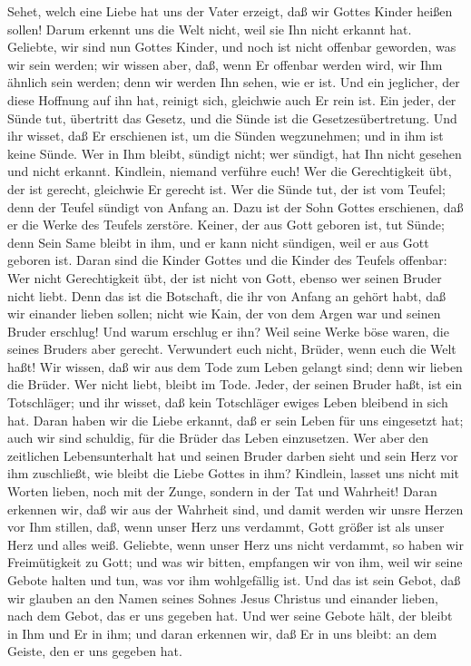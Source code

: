  Sehet, welch eine Liebe hat uns der Vater erzeigt, daß
wir Gottes Kinder heißen sollen! Darum erkennt uns die Welt nicht, weil
sie Ihn nicht erkannt hat.  Geliebte, wir sind nun Gottes
Kinder, und noch ist nicht offenbar geworden, was wir sein werden; wir
wissen aber, daß, wenn Er offenbar werden wird, wir Ihm ähnlich sein
werden; denn wir werden Ihn sehen, wie er ist.  Und ein
jeglicher, der diese Hoffnung auf ihn hat, reinigt sich, gleichwie auch
Er rein ist.  Ein jeder, der Sünde tut, übertritt das
Gesetz, und die Sünde ist die Gesetzesübertretung.  Und
ihr wisset, daß Er erschienen ist, um die Sünden wegzunehmen; und in ihm
ist keine Sünde.  Wer in Ihm bleibt, sündigt nicht; wer
sündigt, hat Ihn nicht gesehen und nicht erkannt. 
Kindlein, niemand verführe euch! Wer die Gerechtigkeit übt, der ist
gerecht, gleichwie Er gerecht ist. Wer die Sünde tut, der ist vom
Teufel; denn der Teufel sündigt von Anfang an.  Dazu ist
der Sohn Gottes erschienen, daß er die Werke des Teufels zerstöre.
 Keiner, der aus Gott geboren ist, tut Sünde; denn Sein
Same bleibt in ihm, und er kann nicht sündigen, weil er aus Gott geboren
ist.  Daran sind die Kinder Gottes und die Kinder des
Teufels offenbar: Wer nicht Gerechtigkeit übt, der ist nicht von Gott,
ebenso wer seinen Bruder nicht liebt.  Denn das ist die
Botschaft, die ihr von Anfang an gehört habt, daß wir einander lieben
sollen;  nicht wie Kain, der von dem Argen war und seinen
Bruder erschlug! Und warum erschlug er ihn? Weil seine Werke böse waren,
die seines Bruders aber gerecht.  Verwundert euch nicht,
Brüder, wenn euch die Welt haßt!  Wir wissen, daß wir aus
dem Tode zum Leben gelangt sind; denn wir lieben die Brüder. Wer nicht
liebt, bleibt im Tode.  Jeder, der seinen Bruder haßt,
ist ein Totschläger; und ihr wisset, daß kein Totschläger ewiges Leben
bleibend in sich hat.  Daran haben wir die Liebe erkannt,
daß er sein Leben für uns eingesetzt hat; auch wir sind schuldig, für
die Brüder das Leben einzusetzen.  Wer aber den
zeitlichen Lebensunterhalt hat und seinen Bruder darben sieht und sein
Herz vor ihm zuschließt, wie bleibt die Liebe Gottes in ihm?
 Kindlein, lasset uns nicht mit Worten lieben, noch mit
der Zunge, sondern in der Tat und Wahrheit!  Daran
erkennen wir, daß wir aus der Wahrheit sind, und damit werden wir unsre
Herzen vor Ihm stillen,  daß, wenn unser Herz uns
verdammt, Gott größer ist als unser Herz und alles weiß. 
Geliebte, wenn unser Herz uns nicht verdammt, so haben wir Freimütigkeit
zu Gott;  und was wir bitten, empfangen wir von ihm, weil
wir seine Gebote halten und tun, was vor ihm wohlgefällig ist.
 Und das ist sein Gebot, daß wir glauben an den Namen
seines Sohnes Jesus Christus und einander lieben, nach dem Gebot, das er
uns gegeben hat.  Und wer seine Gebote hält, der bleibt
in Ihm und Er in ihm; und daran erkennen wir, daß Er in uns bleibt: an
dem Geiste, den er uns gegeben hat.

